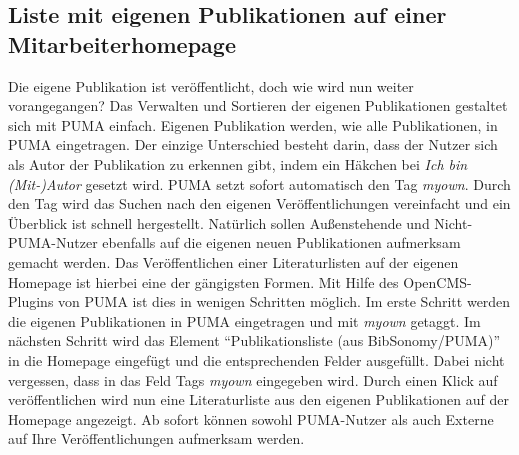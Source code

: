 \subsection{Liste mit eigenen Publikationen auf einer Mitarbeiterhomepage}
Die eigene Publikation ist veröffentlicht, doch wie wird nun weiter vorangegangen? \newline Das Verwalten und Sortieren der eigenen Publikationen gestaltet sich mit PUMA einfach. Eigenen  Publikation werden, wie alle Publikationen, in PUMA eingetragen. Der einzige Unterschied besteht darin, dass der Nutzer sich als Autor der Publikation zu erkennen gibt, indem ein Häkchen bei \textit{Ich bin (Mit-)Autor} gesetzt wird. PUMA setzt sofort automatisch den Tag \textit{myown}. Durch den Tag wird das Suchen nach den eigenen Veröffentlichungen vereinfacht und ein Überblick ist schnell hergestellt.\newline
Natürlich sollen Außenstehende und Nicht-PUMA-Nutzer ebenfalls auf die eigenen neuen Publikationen aufmerksam gemacht werden. Das Veröffentlichen einer Literaturlisten auf der eigenen Homepage ist hierbei eine der gängigsten Formen. Mit Hilfe des OpenCMS-Plugins von PUMA ist dies in wenigen Schritten möglich. Im erste Schritt werden die eigenen Publikationen in PUMA eingetragen und mit \textit{myown} getaggt. Im nächsten Schritt wird das Element \enquote{Publikationsliste (aus BibSonomy/PUMA)} in die Homepage eingefügt und die  entsprechenden Felder ausgefüllt. Dabei nicht vergessen, dass in das Feld Tags \textit{myown} eingegeben wird. Durch einen Klick auf veröffentlichen wird nun eine Literaturliste aus den eigenen Publikationen auf der Homepage angezeigt.  
Ab sofort können sowohl PUMA-Nutzer als auch Externe auf Ihre Veröffentlichungen aufmerksam werden.


